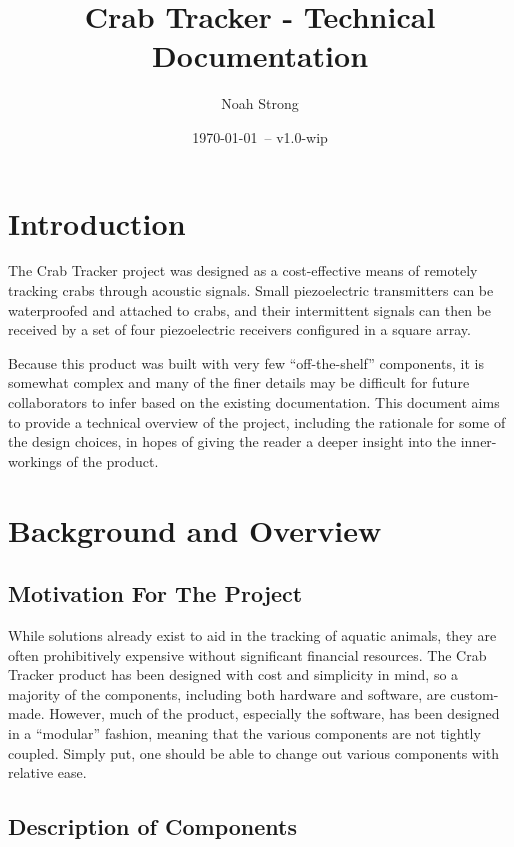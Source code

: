 \documentclass[12pt]{article}
\title{Crab Tracker - Technical Documentation}
\author{
	Noah Strong
}
\date{\today\ -- v1.0-wip}
\begin{document}
\maketitle

\tableofcontents{}

\section{Introduction}

The Crab Tracker project was designed as a cost-effective means of remotely
tracking crabs through acoustic signals.
Small piezoelectric transmitters can be waterproofed and attached to crabs,
and their intermittent signals can then be received by a set of four
piezoelectric receivers configured in a square array.

Because this product was built with very few ``off-the-shelf'' components,
it is somewhat complex and many of the finer details may be difficult for
future collaborators to infer based on the existing documentation.
This document aims to provide a technical overview of the project, including
the rationale for some of the design choices, in hopes of giving the reader
a deeper insight into the inner-workings of the product.

\section{Background and Overview}

\subsection{Motivation For The Project}

While solutions already exist to aid in the tracking of aquatic animals,
they are often prohibitively expensive without significant financial resources.
The Crab Tracker product has been designed with cost and simplicity in mind,
so a majority of the components, including both hardware and software, are
custom-made.
However, much of the product, especially the software, has been designed
in a ``modular'' fashion, meaning that the various components are not tightly
coupled.
Simply put, one should be able to change out various components with relative
ease.

\subsection{Description of Components}
\end{document}
